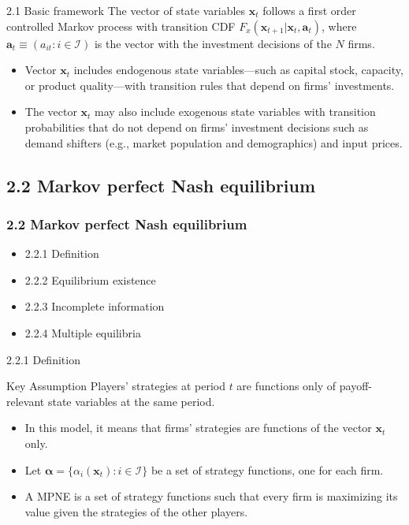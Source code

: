 \documentclass[aspectratio=169]{beamer}  %
\begin{document}
\begin{frame}
{2.1 Basic framework}
The vector of state variables \(\mathbf{x}_t\) follows a first order controlled Markov process with transition CDF \(F_x(\mathbf{x}_{t+1}|\mathbf{x}_t, \boldsymbol{a}_t)\), where \(\boldsymbol{a}_t \equiv (a_{it} : i \in \mathcal{I})\) is the vector with the investment decisions of the \(N\) firms. 
\begin{itemize}
    \item Vector \(\mathbf{x}_t\) includes endogenous state variables—such as capital stock, capacity, or product quality—with transition rules that depend on firms' investments. 
    \item The vector \(\mathbf{x}_t\) may also include exogenous state variables with transition probabilities that do not depend on firms' investment decisions such as demand shifters (e.g., market population and demographics) and input prices.
\end{itemize}
\end{frame}



\subsection{2.2 Markov perfect Nash equilibrium}
\begin{frame}
\frametitle{2.2 Markov perfect Nash equilibrium}
    \begin{itemize}
        \item 2.2.1 Definition
        \item 2.2.2 Equilibrium existence
        \item 2.2.3 Incomplete information
        \item 2.2.4 Multiple equilibria
    \end{itemize}
\end{frame}


\begin{frame}{2.2.1 Definition}
    \begin{block}{Key Assumption}
        Players’ strategies at period \(t\) are functions only of payoff-relevant state variables at the same period.
    \end{block}
    \begin{itemize}
        \item In this model, it means that firms' strategies are functions of the vector \( \mathbf{x}_t \) only.
        \item Let \( \boldsymbol{\alpha} = \{\alpha_i(\mathbf{x}_t) : i \in \mathcal{I}\} \) be a set of strategy functions, one for each firm.
        \item A MPNE is a set of strategy functions such that every firm is maximizing its value given the strategies of the other players.
        
    \end{itemize}
\end{frame}
\end{document}
